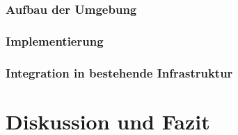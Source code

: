 \documentclass[a4paper, 12pt, oneside]{scrbook}
\begin{document}
		\subsection{Aufbau der Umgebung}
		
		\subsection{Implementierung}
		
			
		
		\subsection{Integration in bestehende Infrastruktur}
			

	
	
	\chapter{Diskussion und Fazit}
	
	
	
	
	\frontmatter
	\printbibliography
\end{document}
